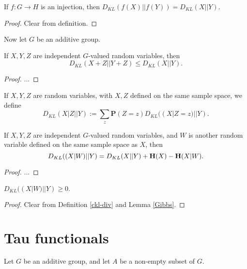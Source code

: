 \begin{lemma}\label{kl-div-inj}  If $f:G \to H$ is an injection, then $D_{KL}(f(X)||f(Y)) = D_{KL}(X||Y)$.
\end{lemma}

\begin{proof} Clear from definition.
\end{proof}

Now let $G$ be an additive group.

\begin{lemma}\label{kl-sums} If $X, Y, Z$ are independent $G$-valued random variables, then
  $$D_{KL}(X+Z||Y+Z) \leq D_{KL}(X||Y).$$
\end{lemma}

\begin{proof}
  ...
\end{proof}

\begin{definition}\label{ckl-div}  If $X,Y,Z$ are random variables, with $X,Z$ defined on the same sample space, we define
$$ D_{KL}(X|Z || Y) := \sum_z \mathbf{P}(Z=z) D_{KL}( (X|Z=z) || Y).$$
\end{definition}

\begin{lemma}\label{kl-cond} If $X, Y, Z$ are independent $G$-valued random variables, and $W$ is another random variable defined on the same sample space as $X$, then
  $$D_{KL}((X|W)||Y) = D_{KL}(X||Y) + {\bf H}(X) - {\bf H}(X|W).$$
\end{lemma}

\begin{proof} ...
\end{proof}

\begin{lemma}\label{Conditional-Gibbs}  $D_{KL}((X|W)||Y) \geq 0$.
\end{lemma}

\begin{proof}  Clear from Definition \ref{ckl-div} and Lemma \ref{Gibbs}.
\end{proof}

\section{Tau functionals}

Let $G$ be an additive group, and let $A$ be a non-empty subset of $G$.

